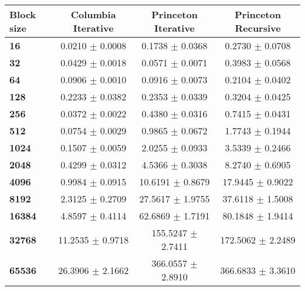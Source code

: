 \begin{tabular}{|l|c|c|c|}\hline
\textbf{Block size}  & \textbf{Columbia Iterative} & \textbf{Princeton Iterative} & \textbf{Princeton Recursive}\\\hline
\textbf{16}  & 0.0210 $\pm$ 0.0008 & 0.1738 $\pm$ 0.0368 & 0.2730 $\pm$ 0.0708\\\hline
\textbf{32}  & 0.0429 $\pm$ 0.0018 & 0.0571 $\pm$ 0.0071 & 0.3983 $\pm$ 0.0568\\\hline
\textbf{64}  & 0.0906 $\pm$ 0.0010 & 0.0916 $\pm$ 0.0073 & 0.2104 $\pm$ 0.0402\\\hline
\textbf{128}  & 0.2233 $\pm$ 0.0382 & 0.2353 $\pm$ 0.0339 & 0.3204 $\pm$ 0.0425\\\hline
\textbf{256}  & 0.0372 $\pm$ 0.0022 & 0.4380 $\pm$ 0.0316 & 0.7415 $\pm$ 0.0431\\\hline
\textbf{512}  & 0.0754 $\pm$ 0.0029 & 0.9865 $\pm$ 0.0672 & 1.7743 $\pm$ 0.1944\\\hline
\textbf{1024}  & 0.1507 $\pm$ 0.0059 & 2.0255 $\pm$ 0.0933 & 3.5339 $\pm$ 0.2466\\\hline
\textbf{2048}  & 0.4299 $\pm$ 0.0312 & 4.5366 $\pm$ 0.3038 & 8.2740 $\pm$ 0.6905\\\hline
\textbf{4096}  & 0.9984 $\pm$ 0.0915 & 10.6191 $\pm$ 0.8679 & 17.9445 $\pm$ 0.9022\\\hline
\textbf{8192}  & 2.3125 $\pm$ 0.2709 & 27.5617 $\pm$ 1.9755 & 37.6118 $\pm$ 1.5008\\\hline
\textbf{16384}  & 4.8597 $\pm$ 0.4114 & 62.6869 $\pm$ 1.7191 & 80.1848 $\pm$ 1.9414\\\hline
\textbf{32768}  & 11.2535 $\pm$ 0.9718 & 155.5247 $\pm$ 2.7411 & 172.5062 $\pm$ 2.2489\\\hline
\textbf{65536} & 26.3906 $\pm$ 2.1662 & 366.0557 $\pm$ 2.8910 & 366.6833 $\pm$ 3.3610\\\hline
\end{tabular}
